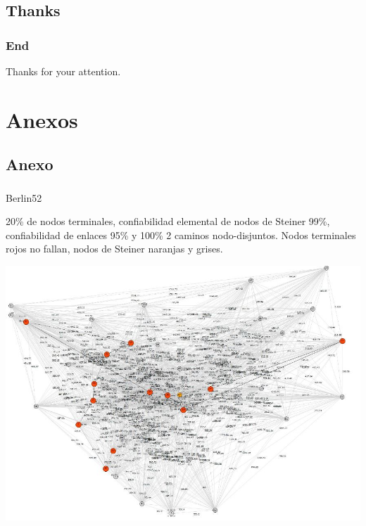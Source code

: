 \subsection{Thanks}
\begin{frame} \frametitle{End}
\begin{huge}
\begin{center}Thanks for your attention.\end{center}
\end{huge}
\end{frame}

\section{Anexos}
\subsection{Anexo}
\begin{frame}\frametitle{}
\begin{block}{Berlin52}
\begin{scriptsize}
20\% de nodos terminales, confiabilidad elemental de nodos de Steiner 99\%, confiabilidad de enlaces 95\% y 100\% 2 caminos nodo-disjuntos.  Nodos terminales rojos no fallan, nodos de Steiner naranjas y grises.
\end{scriptsize}
\begin{center}
   \includegraphics[scale=0.35]{figuras/3}
\end{center}
\end{block}
\end{frame}

